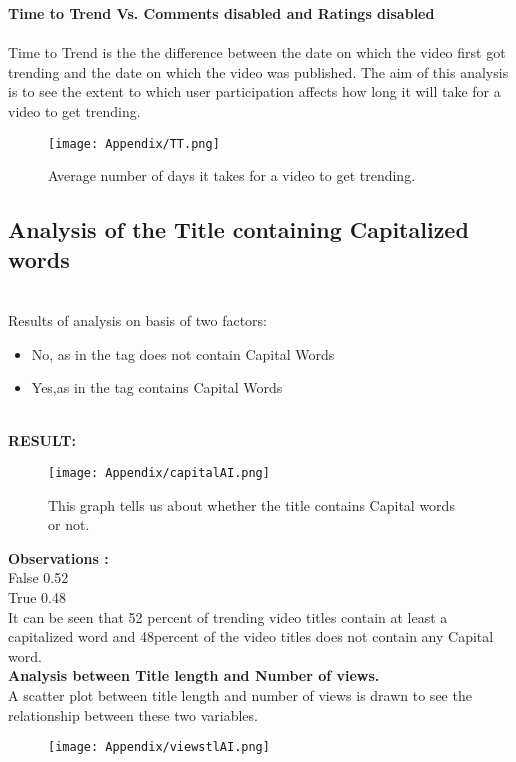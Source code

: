 \documentclass[runningheads]{llncs}
\begin{document}
\textbf{Time to Trend Vs. Comments disabled and Ratings disabled} \\ \\ 
Time to Trend is the the difference between the date on which the video first got trending and the date on which the video was published.
The aim of this analysis is to see the extent to which user participation affects how long it will take for a video to get trending.
\begin{figure}[H]
\centering
\begin{minipage}{.5\textwidth}
  \centering
  \texttt{[image: Appendix/TT.png]}
  \caption{Average number of days it takes for a video to get trending.}
\end{minipage}%
\end{figure}

\subsection{Analysis of the Title containing Capitalized words}\\
Results of analysis on basis of two factors:\\
\begin{itemize}
\item No, as in the tag does not contain Capital Words
\item Yes,as in the tag contains Capital Words
\end{itemize}\\
\textbf{RESULT:}
\begin{figure} 
\texttt{[image: Appendix/capitalAI.png]}
\caption{This graph tells us about whether the title contains Capital words or not.}
\end{figure}
\textbf{Observations : }\\
              False   0.52\\
              True    0.48\\
It can be seen that 52 percent of trending video titles contain at least a capitalized word and 48percent of the video titles does not contain any Capital word.\\

\textbf{Analysis between Title length and Number of views.}\\
A scatter plot between title length and number of views is drawn to see the relationship between these two variables.\\
\begin{figure}
    \texttt{[image: Appendix/viewstlAI.png]}\\
\end{figure}
    
\end{document}
